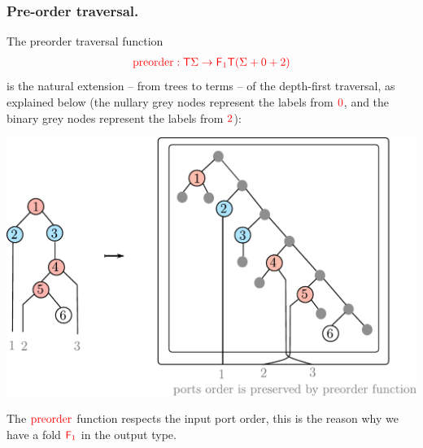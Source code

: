        \subsubsection{Pre-order traversal.} The preorder traversal function  
        \begin{align*}
            {\color{red}{{\color{red}{\mathrm{preorder}}}: {\color{red}{\mathsf T}}\Sigma \to {\color{red}{\mathsf F_{1}}}{\color{red}{\mathsf T}}({\color{red}{\Sigma}}+ 0 + 2)}}
        \end{align*}
        is the natural extension -- from trees to terms -- of the depth-first traversal, as explained below (the nullary grey nodes represent the labels from ${\color{red}{0}}$, and the binary grey nodes represent the labels from ${\color{red}{2}}$):
        \begin{center}
        \includegraphics[scale=.45]{preorder.pdf}
        \end{center}
The ${\color{red}{\mathrm{preorder}}}$ function respects the input port order, this is the reason  why we have a fold $\reduce 1$ in the output type. 
